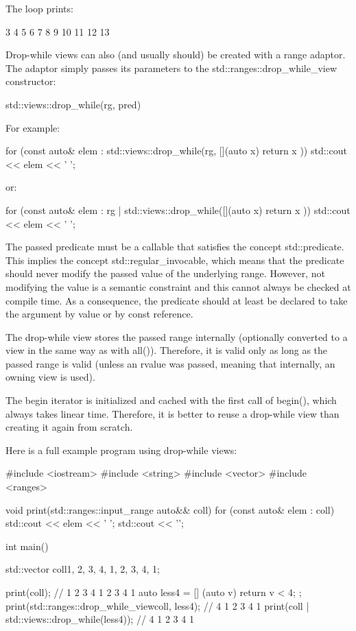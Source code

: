 The loop prints:

\begin{shell}
3 4 5 6 7 8 9 10 11 12 13
\end{shell}


Drop-while views can also (and usually should) be created with a range adaptor. The adaptor simply passes its parameters to the std::ranges::drop\_while\_view constructor:

\begin{cpp}
std::views::drop_while(rg, pred)
\end{cpp}

For example:

\begin{cpp}
for (const auto& elem : std::views::drop_while(rg, [](auto x) {
						return x %
					})) {
	std::cout << elem << ' ';
}
\end{cpp}

or:

\begin{cpp}
for (const auto& elem : rg | std::views::drop_while([](auto x) {
						return x %
					})) {
	std::cout << elem << ' ';
}
\end{cpp}

The passed predicate must be a callable that satisfies the concept std::predicate. This implies the concept std::regular\_invocable, which means that the predicate should never modify the passed value of the underlying range. However, not modifying the value is a semantic constraint and this cannot always be checked at compile time. As a consequence, the predicate should at least be declared to take the argument by value or by const reference.

The drop-while view stores the passed range internally (optionally converted to a view in the same way as with all()). Therefore, it is valid only as long as the passed range is valid (unless an rvalue was passed, meaning that internally, an owning view is used).

The begin iterator is initialized and cached with the first call of begin(), which always takes linear time.
Therefore, it is better to reuse a drop-while view than creating it again from scratch.

Here is a full example program using drop-while views:


\begin{cpp}
#include <iostream>
#include <string>
#include <vector>
#include <ranges>

void print(std::ranges::input_range auto&& coll)
{
	for (const auto& elem : coll) {
		std::cout << elem << ' ';
	}
	std::cout << '\n';
}

int main()
{
	std::vector coll{1, 2, 3, 4, 1, 2, 3, 4, 1};
	
	print(coll); // 1 2 3 4 1 2 3 4 1
	auto less4 = [] (auto v) { return v < 4; };
	print(std::ranges::drop_while_view{coll, less4}); // 4 1 2 3 4 1
	print(coll | std::views::drop_while(less4)); // 4 1 2 3 4 1
}
\end{cpp}

